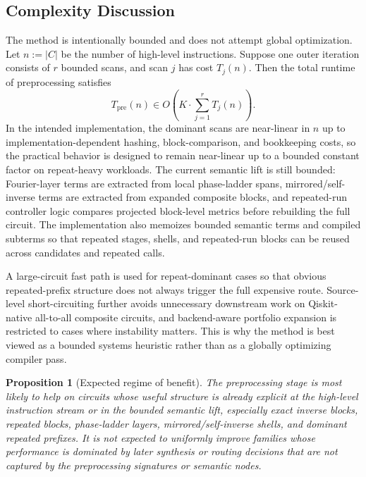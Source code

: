 \documentclass[11pt]{article}
\newtheorem{proposition}{Proposition}
\begin{document}
\subsection{Complexity Discussion}

The method is intentionally bounded and does not attempt global optimization. Let $n := |C|$ be the number of high-level instructions. Suppose one outer iteration consists of $r$ bounded scans, and scan $j$ has cost $T_j(n)$. Then the total runtime of preprocessing satisfies
\[
T_{\mathrm{pre}}(n)
\in
O\!\left(
K \cdot \sum_{j=1}^{r} T_j(n)
\right).
\]
In the intended implementation, the dominant scans are near-linear in $n$ up to implementation-dependent hashing, block-comparison, and bookkeeping costs, so the practical behavior is designed to remain near-linear up to a bounded constant factor on repeat-heavy workloads. The current semantic lift is still bounded: Fourier-layer terms are extracted from local phase-ladder spans, mirrored/self-inverse terms are extracted from expanded composite blocks, and repeated-run controller logic compares projected block-level metrics before rebuilding the full circuit. The implementation also memoizes bounded semantic terms and compiled subterms so that repeated stages, shells, and repeated-run blocks can be reused across candidates and repeated calls.

A large-circuit fast path is used for repeat-dominant cases so that obvious repeated-prefix structure does not always trigger the full expensive route. Source-level short-circuiting further avoids unnecessary downstream work on Qiskit-native all-to-all composite circuits, and backend-aware portfolio expansion is restricted to cases where instability matters. This is why the method is best viewed as a bounded systems heuristic rather than as a globally optimizing compiler pass.

\begin{proposition}[Expected regime of benefit]
The preprocessing stage is most likely to help on circuits whose useful structure is already explicit at the high-level instruction stream or in the bounded semantic lift, especially exact inverse blocks, repeated blocks, phase-ladder layers, mirrored/self-inverse shells, and dominant repeated prefixes. It is not expected to uniformly improve families whose performance is dominated by later synthesis or routing decisions that are not captured by the preprocessing signatures or semantic nodes.
\end{proposition}
\end{document}
